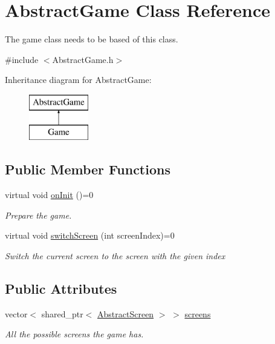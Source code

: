 \hypertarget{class_abstract_game}{}\section{Abstract\+Game Class Reference}
\label{class_abstract_game}


The game class needs to be based of this class.  




{\ttfamily \#include $<$Abstract\+Game.\+h$>$}

Inheritance diagram for Abstract\+Game\+:\begin{figure}[H]
\begin{center}
\leavevmode
\includegraphics[height=2.000000cm]{class_abstract_game}
\end{center}
\end{figure}
\subsection*{Public Member Functions}
\begin{DoxyCompactItemize}
\item 
virtual void \mbox{\hyperlink{class_abstract_game_ae0bd76d926812f81e5e637ade3b1015f}{on\+Init}} ()=0
\begin{DoxyCompactList}\small\item\em Prepare the game. \end{DoxyCompactList}\item 
virtual void \mbox{\hyperlink{class_abstract_game_afd50e09c9b23aff40c752990947f07ce}{switch\+Screen}} (int screen\+Index)=0
\begin{DoxyCompactList}\small\item\em Switch the current screen to the screen with the given index \end{DoxyCompactList}\end{DoxyCompactItemize}
\subsection*{Public Attributes}
\begin{DoxyCompactItemize}
\item 
vector$<$ shared\+\_\+ptr$<$ \mbox{\hyperlink{class_abstract_screen}{Abstract\+Screen}} $>$ $>$ \mbox{\hyperlink{class_abstract_game_add5999d1c4190a9ad25dfdb51327720b}{screens}}
\begin{DoxyCompactList}\small\item\em All the possible screens the game has. \end{DoxyCompactList}\end{DoxyCompactItemize}
